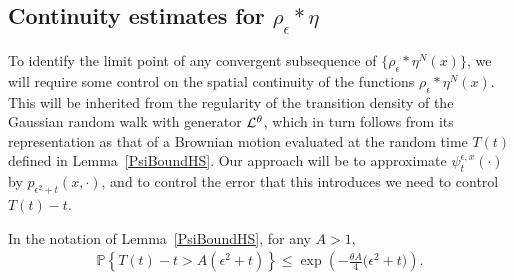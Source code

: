 \documentclass[EJP]{ejpecp} %
\newcommand{\IP}{\mathbb P}
\begin{document}
\subsection{Continuity estimates for $\rho_\epsilon*\eta$}
\label{continuity for random walk}

To identify the limit point of any convergent subsequence
of $\{\rho_\epsilon*\eta^N(x)\}$, 
we will require some control on the spatial continuity of the 
functions $\rho_\epsilon*\eta^N(x)$. This will be inherited from the regularity
of the transition density of the 
Gaussian random walk with generator ${\cal L}^\theta$, which in turn follows
from its representation
as that of a Brownian motion evaluated at the random time $T(t)$ defined
in Lemma~\ref{PsiBoundHS}.
Our approach will be to 
approximate $\psi_t^{\epsilon,x}(\cdot)$ by $p_{\epsilon^2+t}(x, \cdot)$,
and to control the error that this introduces we 
need to control $T(t)-t$. 

\begin{lemma}
    \label{lem:poisson_ld}
    In the notation of Lemma~\ref{PsiBoundHS}, for any $A>1$,
    \begin{align*}
        \IP\left\{
            T(t) - t > A(\epsilon^2 + t)
        \right\}
    \le
	    \exp\left(-\frac{\theta A}{4}\big(\epsilon^2+t\big)
	    \right) .
    \end{align*}
\end{lemma}
\end{document}
